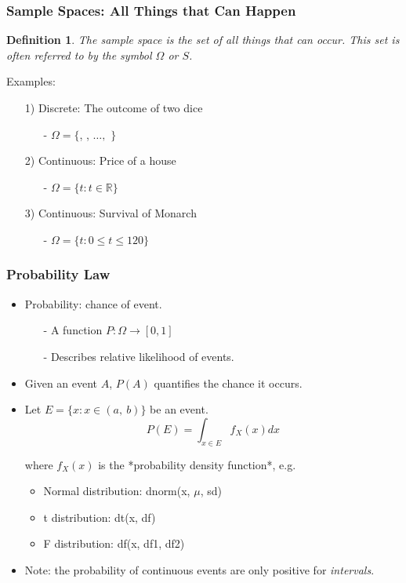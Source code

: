 \documentclass[aspectratio=169, handout]{beamer}
\def\die#1{{\domino#1}}
\newtheorem{defn}{Definition}
\numberwithin{equation}{section}
\begin{document}
\begin{frame}
\frametitle{Sample Spaces: All Things that Can Happen}

\begin{defn}
The \alert{sample space} is the set of all things that can occur.  This set is often referred to by the symbol $\Omega$ or $S$.
\end{defn}
\pause 
{Examples: } \pause 
\begin{itemize}
\item[1)] Discrete: The outcome of two dice 
\begin{itemize}
\item[-] $\Omega = \{$\die1\die1, \die1\die2 ,  $\hdots,$ \die6\die6$ \}$ \pause
\end{itemize}
\item[2)] Continuous: Price of a house
\begin{itemize}
\item[-] $\Omega = \{t: t\in \mathbb{R}\}$ 
\end{itemize}
\item[3)] Continuous: Survival of Monarch 
\begin{itemize}
\item[-] $\Omega = \{t: 0\leq t \leq 120\}$ 
\end{itemize}

\end{itemize}
\end{frame}


\begin{frame}
\frametitle{Probability Law}
\begin{itemize}
\item \alert{Probability}: chance of event.
\begin{itemize}
\item[-] A function $P: \Omega \rightarrow [0,1]$
\item[-] Describes relative likelihood of events.
\end{itemize}
\item Given an event $A$, $P(A)$ quantifies the chance it occurs.
\item Let $E=\{x : x \in(a,\ b)\}$ be an event.
$$P(E)=\int_{x \in E} f_X(x) dx$$
\item[] where $f_X(x)$ is the *probability density function*, e.g.
\begin{itemize}
\item Normal distribution: dnorm(x, $\mu$, sd)
\item t distribution: dt(x, df)
\item F distribution: df(x, df1, df2)
\end{itemize}
\item Note: the probability of continuous events are only positive for \emph{intervals}.
\end{itemize}
\end{frame}
\end{document}
